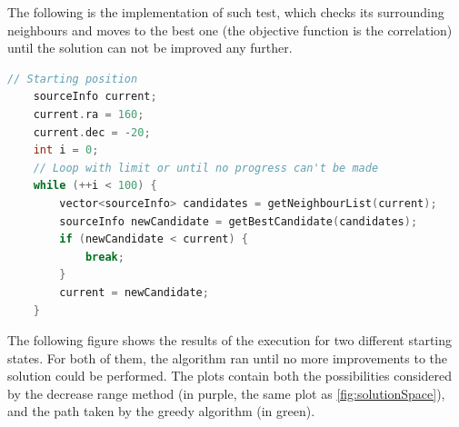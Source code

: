 The following is the implementation of such test, which checks its surrounding neighbours and moves to the best one (the objective function is the correlation) until the solution can not be improved any further.

\begin{minipage}{\linewidth}
	\begin{lstlisting}[language=c, caption=Hill Climbing]
	// Starting position
	sourceInfo current;
	current.ra = 160;
	current.dec = -20;
	int i = 0;
	// Loop with limit or until no progress can't be made
	while (++i < 100) {
		vector<sourceInfo> candidates = getNeighbourList(current);
		sourceInfo newCandidate = getBestCandidate(candidates);
		if (newCandidate < current) {
			break;
		}
		current = newCandidate;
	}
	\end{lstlisting}
\end{minipage}

The following figure shows the results of the execution for two different starting states. For both of them, the algorithm ran until no more improvements to the solution could be performed. The plots contain both the possibilities considered by the decrease range method (in purple, the same plot as \ref{fig:solutionSpace}), and the path taken by the greedy algorithm (in green).

